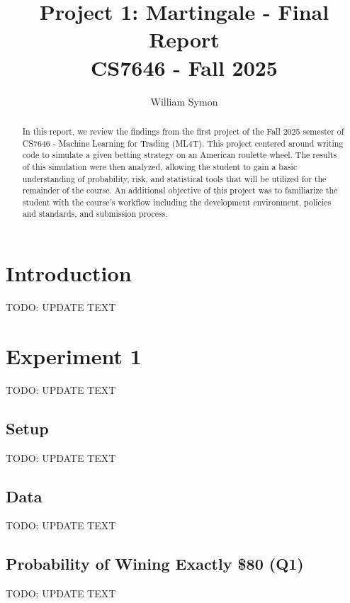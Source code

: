 \documentclass[
	letterpaper, %
]{jdf}
\author{William Symon}
\title{Project 1: Martingale - Final Report\\CS7646 - Fall 2025}
\begin{document}

\maketitle

\begin{abstract}
	In this report, we review the findings from the first project of the Fall 2025 semester of CS7646 - Machine Learning for Trading (ML4T). This project centered around writing code to simulate a given betting strategy on an American roulette wheel. The results of this simulation were then analyzed, allowing the student to gain a basic understanding of probability, risk, and statistical tools that will be utilized for the remainder of the course. An additional objective of this project was to familiarize the student with the course's workflow including the development environment, policies and standards, and submission process. 
\end{abstract}

\section{Introduction}
TODO: UPDATE TEXT

\section{Experiment 1}
TODO: UPDATE TEXT

\subsection{Setup}
TODO: UPDATE TEXT

\subsection{Data}
TODO: UPDATE TEXT

\subsection{Probability of Wining Exactly \$80 (Q1)}
TODO: UPDATE TEXT
\end{document}
